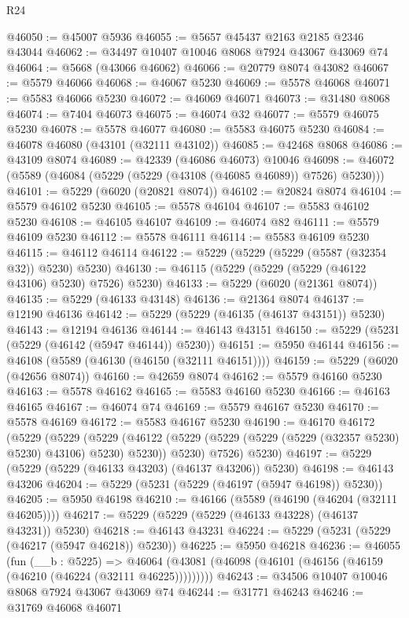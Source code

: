 \begin{lexlean}{R24}
\begin{coremodule}
@46050 := @45007 @5936
@46055 := @5657 @45437 @2163 @2185 @2346 @43044
@46062 := @34497 @10407 @10046 @8068 @7924 @43067 @43069 @74
@46064 := @5668 (@43066 @46062)
@46066 := @20779 @8074 @43082
@46067 := @5579 @46066
@46068 := @46067 @5230
@46069 := @5578 @46068
@46071 := @5583 @46066 @5230
@46072 := @46069 @46071
@46073 := @31480 @8068
@46074 := @7404 @46073
@46075 := @46074 @32
@46077 := @5579 @46075 @5230
@46078 := @5578 @46077
@46080 := @5583 @46075 @5230
@46084 := @46078 @46080 (@43101 (@32111 @43102))
@46085 := @42468 @8068
@46086 := @43109 @8074
@46089 := @42339 (@46086 @46073) @10046
@46098 := @46072 (@5589 (@46084 (@5229 (@5229 (@43108 (@46085 @46089)) @7526) @5230)))
@46101 := @5229 (@6020 (@20821 @8074))
@46102 := @20824 @8074
@46104 := @5579 @46102 @5230
@46105 := @5578 @46104
@46107 := @5583 @46102 @5230
@46108 := @46105 @46107
@46109 := @46074 @82
@46111 := @5579 @46109 @5230
@46112 := @5578 @46111
@46114 := @5583 @46109 @5230
@46115 := @46112 @46114
@46122 := @5229 (@5229 (@5229 (@5587 (@32354 @32)) @5230) @5230)
@46130 := @46115 (@5229 (@5229 (@5229 (@46122 @43106) @5230) @7526) @5230)
@46133 := @5229 (@6020 (@21361 @8074))
@46135 := @5229 (@46133 @43148)
@46136 := @21364 @8074
@46137 := @12190 @46136
@46142 := @5229 (@5229 (@46135 (@46137 @43151)) @5230)
@46143 := @12194 @46136
@46144 := @46143 @43151
@46150 := @5229 (@5231 (@5229 (@46142 (@5947 @46144)) @5230))
@46151 := @5950 @46144
@46156 := @46108 (@5589 (@46130 (@46150 (@32111 @46151))))
@46159 := @5229 (@6020 (@42656 @8074))
@46160 := @42659 @8074
@46162 := @5579 @46160 @5230
@46163 := @5578 @46162
@46165 := @5583 @46160 @5230
@46166 := @46163 @46165
@46167 := @46074 @74
@46169 := @5579 @46167 @5230
@46170 := @5578 @46169
@46172 := @5583 @46167 @5230
@46190 := @46170
    @46172
    (@5229
      (@5229
        (@5229
          (@46122 (@5229 (@5229 (@5229 (@5229 (@32357 @5230) @5230) @43106) @5230) @5230))
          @5230)
        @7526)
      @5230)
@46197 := @5229 (@5229 (@5229 (@46133 @43203) (@46137 @43206)) @5230)
@46198 := @46143 @43206
@46204 := @5229 (@5231 (@5229 (@46197 (@5947 @46198)) @5230))
@46205 := @5950 @46198
@46210 := @46166 (@5589 (@46190 (@46204 (@32111 @46205))))
@46217 := @5229 (@5229 (@5229 (@46133 @43228) (@46137 @43231)) @5230)
@46218 := @46143 @43231
@46224 := @5229 (@5231 (@5229 (@46217 (@5947 @46218)) @5230))
@46225 := @5950 @46218
@46236 := @46055
    (fun (__b : @5225) =>
    @46064 (@43081 (@46098 (@46101 (@46156 (@46159 (@46210 (@46224 (@32111 @46225)))))))))
@46243 := @34506 @10407 @10046 @8068 @7924 @43067 @43069 @74
@46244 := @31771 @46243
@46246 := @31769 @46068 @46071

\end{coremodule}
\end{lexlean}
